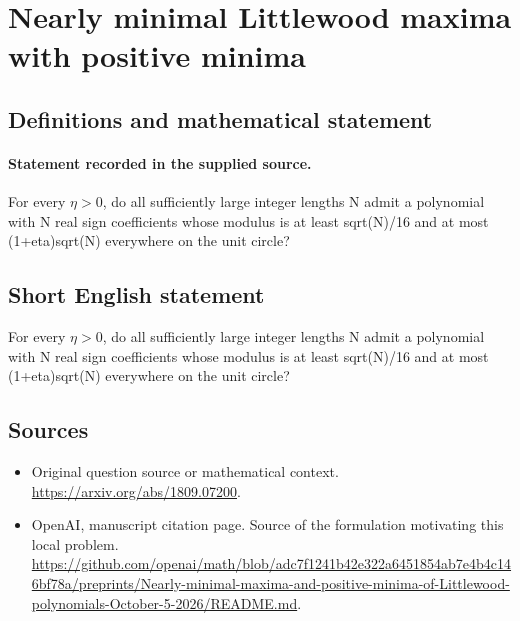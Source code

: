 \documentclass[11pt]{article}
\begin{document}
\section*{Nearly minimal Littlewood maxima with positive minima}\label{30007432}
\subsection{Definitions and mathematical statement}
\paragraph{Statement recorded in the supplied source.}
For every $\eta >0$, do all sufficiently large integer lengths N admit a polynomial with N real sign coefficients whose modulus is at least sqrt(N)/16 and at most (1+eta)sqrt(N) everywhere on the unit circle?
\subsection{Short English statement}
For every $\eta >0$, do all sufficiently large integer lengths N admit a polynomial with N real sign coefficients whose modulus is at least sqrt(N)/16 and at most (1+eta)sqrt(N) everywhere on the unit circle?
\subsection{Sources}
\begin{itemize}
\item[S1] Original question source or mathematical context.
\url{https://arxiv.org/abs/1809.07200}.
\item[S2] OpenAI, manuscript citation page. Source of the formulation motivating this local problem.
\url{https://github.com/openai/math/blob/adc7f1241b42e322a6451854ab7e4b4c146bf78a/preprints/Nearly-minimal-maxima-and-positive-minima-of-Littlewood-polynomials-October-5-2026/README.md}.
\end{itemize}
\end{document}
